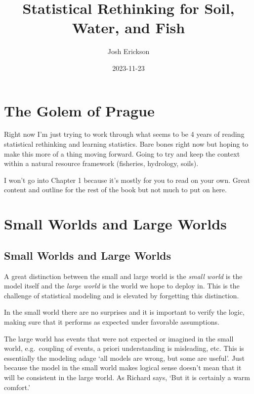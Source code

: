 \documentclass[
]{book}
\title{Statistical Rethinking for Soil, Water, and Fish}
\author{Josh Erickson}
\date{2023-11-23}
\begin{document}
\maketitle

{
\setcounter{tocdepth}{1}
\tableofcontents
}
\hypertarget{the-golem-of-prague}{%
\chapter{The Golem of Prague}\label{the-golem-of-prague}}

Right now I'm just trying to work through what seems to be 4 years of reading statistical rethinking and learning statistics. Bare bones right now but hoping to make this more of a thing moving forward. Going to try and keep the context within a natural resource framework (fisheries, hydrology, soils).

I won't go into Chapter 1 because it's mostly for you to read on your own. Great content and outline for the rest of the book but not much to put on here.

\hypertarget{small-worlds-and-large-worlds}{%
\chapter{Small Worlds and Large Worlds}\label{small-worlds-and-large-worlds}}

\hypertarget{small-worlds-and-large-worlds-1}{%
\section{Small Worlds and Large Worlds}\label{small-worlds-and-large-worlds-1}}

A great distinction between the small and large world is the \emph{small world} is the model itself and the \emph{large world} is the world we hope to deploy in. This is the challenge of statistical modeling and is elevated by forgetting this distinction.

In the small world there are no surprises and it is important to verify the logic, making sure that it performs as expected under favorable assumptions.

The large world has events that were not expected or imagined in the small world, e.g.~coupling of events, a priori understanding is misleading, etc. This is essentially the modeling adage `all models are wrong, but some are useful'. Just because the model in the small world makes logical sense doesn't mean that it will be consistent in the large world. As Richard says, `But it is certainly a warm comfort.'
\end{document}
